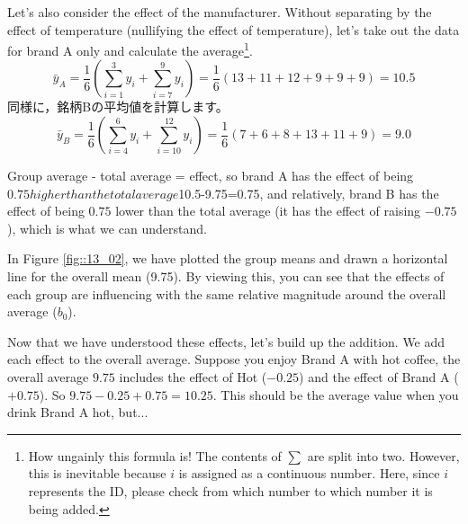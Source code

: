 \documentclass{ltjbook}
\begin{document}
Let's also consider the effect of the manufacturer. Without separating by the effect of temperature (nullifying the effect of temperature), let's take out the data for brand A only and calculate the average\footnote{How ungainly this formula is! The contents of $\sum$ are split into two. However, this is inevitable because $i$ is assigned as a continuous number. Here, since $i$ represents the ID, please check from which number to which number it is being added.}.
\[ \bar{y}_{A} = \frac{1}{6}\left(\sum_{i=1}^3y_{i} + \sum_{i=7}^9y_i \right)= \frac{1}{6}(13+11+12+9+9+9) = 10.5 \]
同様に，銘柄Bの平均値を計算します。
\[ \bar{y}_{B} = \frac{1}{6}\left(\sum_{i=4}^6y_i + \sum_{i=10}^{12}y_i \right) =\frac{1}{6}(7+6+8+13+11+9)= 9.0 \]

Group average - total average = effect, so brand A has the effect of being $0.75 higher than the total average $10.5-9.75=0.75, and relatively, brand B has the effect of being $0.75$ lower than the total average (it has the effect of raising $-0.75$), which is what we can understand.

In Figure \ref{fig::13_02}, we have plotted the group means and drawn a horizontal line for the overall mean (9.75). By viewing this, you can see that the effects of each group are influencing with the same relative magnitude around the overall average ($b_0$).


Now that we have understood these effects, let's build up the addition. We add each effect to the overall average. Suppose you enjoy Brand A with hot coffee, the overall average $9.75$ includes the effect of Hot ($-0.25$) and the effect of Brand A ($+0.75$). So $9.75 -0.25 + 0.75 = 10.25$. This should be the average value when you drink Brand A hot, but...
\end{document}
